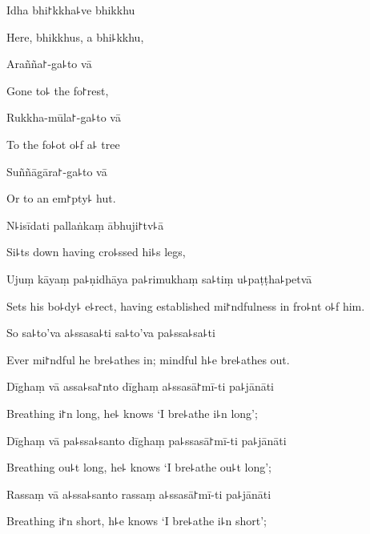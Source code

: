 Idha bhi꜓kkha꜕ve bhikkhu

\begin{english}
  Here, bhikkhus, a bhi꜕kkhu,
\end{english}

Arañña꜓-ga꜕to vā

\begin{english}
  Gone to꜕ the fo꜓rest,
\end{english}

Rukkha-mūla꜓-ga꜕to vā

\begin{english}
  To the fo꜕ot o꜕f a꜕ tree
\end{english}

Suññāgāra꜓-ga꜕to vā

\begin{english}
  Or to an em꜓pty꜕ hut.
\end{english}

N꜕isīdati pallaṅkaṃ ābhuji꜓tv꜕ā

\begin{english}
  Si꜕ts down having cro꜕ssed hi꜕s legs,
\end{english}

Ujuṃ kāyaṃ pa꜕ṇidhāya pa꜕rimukhaṃ sa꜕tiṃ u꜕paṭṭha꜕petvā

\begin{english}
  Sets his bo꜕dy꜕ e꜕rect, having established mi꜓ndfulness in fro꜕nt o꜕f him.
\end{english}

So sa꜕to'va a꜕ssasa꜕ti sa꜕to'va pa꜕ssa꜕sa꜕ti

\begin{english}
  Ever mi꜓ndful he bre꜕athes in; mindful h꜕e bre꜕athes out.
\end{english}

Dīghaṃ vā assa꜕sa꜓nto dīghaṃ a꜕ssasā꜓mī-ti pa꜕jānāti

\begin{english}
  Breathing i꜓n long, he꜕ knows `I bre꜕athe i꜕n long';
\end{english}

Dīghaṃ vā pa꜕ssa꜕santo dīghaṃ pa꜕ssasā꜓mī-ti pa꜕jānāti

\begin{english}
  Breathing ou꜕t long, he꜕ knows `I bre꜕athe ou꜕t long';
\end{english}

Rassaṃ vā a꜕ssa꜕santo rassaṃ a꜕ssasā꜓mī-ti pa꜕jānāti

\begin{english}
  Breathing i꜓n short, h꜕e knows `I bre꜕athe i꜕n short';
\end{english}

